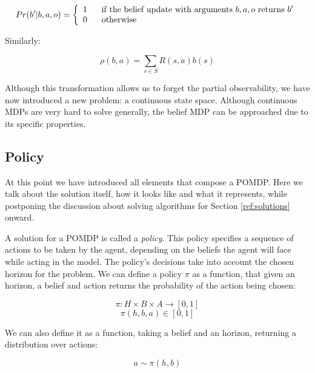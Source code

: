 \[Pr(b' | b, a, o) = \left\{
  \begin{array}{lr}
    1 \hspace{.6cm}\text{if the belief update with arguments $b,a,o$ returns $b'$}\\
    0 \hspace{.6cm}\text{otherwise}
  \end{array}
\right.
\]

Similarly:

\[ \rho(b,a) = \sum_{s\in S} R(s,a) b(s) \]

Although this transformation allows us to forget the partial observability, we have now introduced a
new problem: a continuous state space. Although continuous MDPs are very hard to solve generally,
the belief MDP can be approached due to its specific properties.

\subsection{Policy}

At this point we have introduced all elements that compose a POMDP. Here we talk about the solution
itself, how it looks like and what it represents, while postponing the discussion about solving
algorithms for Section \ref{ref:solutions} onward.

A solution for a POMDP is called a \textit{policy}. This policy specifies a sequence of actions to
be taken by the agent, depending on the beliefs the agent will face while acting in the model. The
policy's decisions take into account the chosen horizon for the problem. We can define a policy
$\pi$ as a function, that given an horizon, a belief and action returns the probability of the action
being chosen:

\[ \pi : H \times B \times A \rightarrow [0,1] \]
\[ \pi(h, b, a) \in [0,1] \]

We can also define it as a function, taking a belief and an horizon, returning a distribution over
actions:

\[ a \sim \pi(h, b) \]

